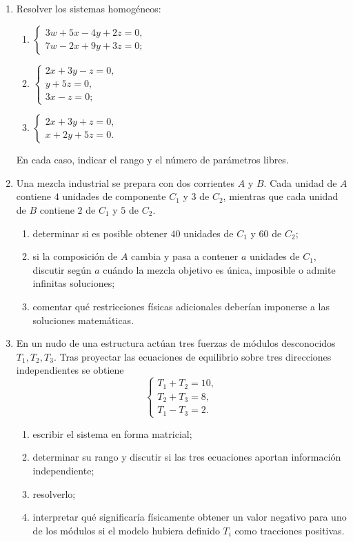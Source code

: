\begin{enumerate}[label=\textbf{\arabic*.},leftmargin=*]
\item Resolver los sistemas homogéneos:
\begin{enumerate}[label=\alph*)]
\item $\begin{cases}3w+5x-4y+2z=0,\\7w-2x+9y+3z=0;\end{cases}$
\item $\begin{cases}2x+3y-z=0,\\y+5z=0,\\3x-z=0;\end{cases}$
\item $\begin{cases}2x+3y+z=0,\\x+2y+5z=0.\end{cases}$
\end{enumerate}
En cada caso, indicar el rango y el número de parámetros libres.

\item Una mezcla industrial se prepara con dos corrientes $A$ y $B$. Cada unidad de $A$ contiene $4$ unidades de componente $C_1$ y $3$ de $C_2$, mientras que cada unidad de $B$ contiene $2$ de $C_1$ y $5$ de $C_2$.
\begin{enumerate}[label=\alph*)]
\item determinar si es posible obtener $40$ unidades de $C_1$ y $60$ de $C_2$;
\item si la composición de $A$ cambia y pasa a contener $a$ unidades de $C_1$, discutir según $a$ cuándo la mezcla objetivo es única, imposible o admite infinitas soluciones;
\item comentar qué restricciones físicas adicionales deberían imponerse a las soluciones matemáticas.
\end{enumerate}

\item En un nudo de una estructura actúan tres fuerzas de módulos desconocidos $T_1,T_2,T_3$. Tras proyectar las ecuaciones de equilibrio sobre tres direcciones independientes se obtiene
\[
\begin{cases}
T_1+T_2=10,\\
T_2+T_3=8,\\
T_1-T_3=2.
\end{cases}
\]
\begin{enumerate}[label=\alph*)]
\item escribir el sistema en forma matricial;
\item determinar su rango y discutir si las tres ecuaciones aportan información independiente;
\item resolverlo;
\item interpretar qué significaría físicamente obtener un valor negativo para uno de los módulos si el modelo hubiera definido $T_i$ como tracciones positivas.
\end{enumerate}


\end{enumerate}

